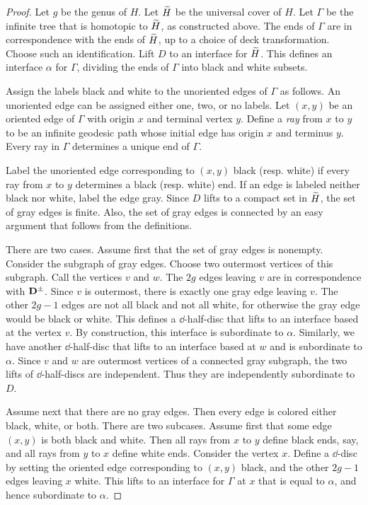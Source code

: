 \begin{proof}
Let $g$ be the genus of $H$.  Let $\widetilde{H}$ be the universal cover of $H$.  Let $\Gamma$ be the infinite tree that is homotopic to $\widetilde{H}$, as constructed above.  The ends of $\Gamma$ are in correspondence with the ends of $\widetilde{H}$, up to a choice of deck transformation.  Choose such an identification.  Lift $D$ to an interface for $\widetilde{H}$.  This defines an interface $\alpha$ for $\Gamma$, dividing the ends of $\Gamma$ into  black and white subsets.

Assign the labels black and white to the unoriented edges of $\Gamma$ as follows.  An unoriented edge can be assigned either one, two, or no labels.  Let $(x,y)$ be an oriented edge of $\Gamma$ with origin $x$ and terminal vertex $y$.  Define a \emph{ray} from $x$ to $y$ to be an infinite geodesic path whose initial edge has origin $x$ and terminus $y$.  Every ray in $\Gamma$ determines a unique end of $\Gamma$.

Label the unoriented edge corresponding to $(x,y)$ black (resp. white) if every ray from $x$ to $y$ determines a black (resp. white) end.  If an edge is labeled neither black nor white, label the edge gray.  Since $D$ lifts to a compact
set in $\widetilde{H}$, the set of gray edges is finite.  Also, the set of gray edges is connected by an easy argument that follows from the definitions.

There are two cases.  Assume first that the set of gray edges is nonempty.  Consider the subgraph of gray edges.  Choose two outermost vertices of this subgraph.  Call the vertices $v$ and $w$.  The $2g$ edges leaving
$v$ are in correspondence with $\mathbf{D}^\pm$.  Since $v$ is outermost, there is exactly one gray edge leaving $v$.  The other $2g-1$ edges are not all black
and not all white, for otherwise the gray edge would be black or white.  This defines a $\dd$-half-disc that lifts to an interface based at the vertex $v$.  By construction, this interface is subordinate to $\alpha$.  Similarly, we have another $\dd$-half-disc that lifts to an interface based at $w$ and is subordinate to $\alpha$.  Since $v$ and $w$ are outermost vertices of a connected gray subgraph, the two lifts of $\dd$-half-discs are independent.  Thus they are independently subordinate to $D$.

Assume next that there are no gray edges.  Then every edge is colored either black, white, or both.  There are two subcases.  Assume first that some edge $(x,y)$ is both black and white.  Then all rays from $x$ to $y$ define black ends, say, and all rays from $y$ to $x$ define white ends.  Consider the vertex $x$.  Define a $\dd$-disc by setting the oriented edge corresponding to $(x,y)$ black, and the other $2g-1$ edges leaving $x$ white.  This lifts to an interface for $\Gamma$ at $x$ that is equal to $\alpha$, and hence subordinate to $\alpha$.


\end{proof}
